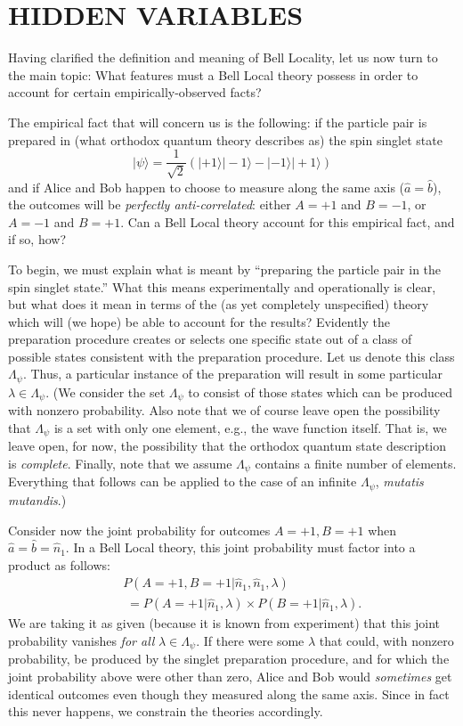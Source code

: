 \documentclass[aps,prc,onecolumn,12pt]{revtex4-2}
\begin{document}
\section{HIDDEN VARIABLES}
\label{sec3}

Having clarified the definition and meaning of Bell Locality, let us
now turn to the main topic:  What features must a Bell Local theory
possess in order to account for certain empirically-observed facts?

The empirical fact that will concern us is the following:  if the
particle pair is prepared in (what orthodox quantum theory describes as)
the spin singlet state
\begin{equation}
|\psi\rangle = \frac{1}{\sqrt{2}} \left( |+1\rangle |-1\rangle -
 |-1\rangle |+1\rangle \right)
\end{equation}
and if Alice and Bob happen to choose to measure along the same axis
($\hat{a}=\hat{b}$), the outcomes will be \emph{perfectly anti-correlated}:
either $A = +1$ and $B=-1$, or $A=-1$ and $B=+1$.  Can a Bell Local
theory account for this empirical fact, and if so, how?

To begin, we must explain what is meant by ``preparing the particle
pair in the spin singlet state.''  What this means experimentally and
operationally is clear, but what does it mean in terms of the (as yet
completely unspecified) theory which will (we hope) be able
to account for the results?
Evidently the preparation procedure creates or selects one specific
state out of a class of possible states consistent with the
preparation procedure.  Let us denote this class $ \Lambda_\psi $.
Thus, a particular instance of the preparation will result in
some particular  $\lambda  \in  \Lambda_\psi $.
(We consider the set $\Lambda_\psi$ to consist of those
states which can be produced with nonzero probability.  Also note that
we of course leave open the possibility that $\Lambda_\psi$
is a set with only one element, e.g., the wave function itself.
That is, we leave open, for now, the possibility that the
orthodox quantum state description is \emph{complete}.  Finally, note
that we assume $\Lambda_\psi$ contains a finite number of elements.
Everything that follows can be applied to the case of an infinite
$\Lambda_\psi$, \emph{mutatis mutandis}.)

Consider now the joint probability for outcomes $A=+1, B=+1$ when
$\hat{a} = \hat{b} = \hat{n}_1$.  In a Bell Local
theory, this joint probability must factor into a product as follows:
\begin{eqnarray}
&&P(A=+1,B=+1 | \hat{n}_1,\hat{n}_1, \lambda) \nonumber \\
&& \; = P(A=+1 | \hat{n}_1,\lambda)
\times P(B=+1 | \hat{n}_1,\lambda).
\end{eqnarray}
We are taking it as given (because it is known from experiment)
that this joint probability vanishes \emph{for
all} $\lambda \in \Lambda_\psi $.  If there were some $\lambda$ that
could, with nonzero probability, be produced by the singlet preparation
procedure, and for which the joint probability above were other than
zero, Alice and Bob would \emph{sometimes} get identical outcomes
even though they measured along the same axis.  Since in fact this
never happens, we constrain the theories accordingly.
\end{document}
